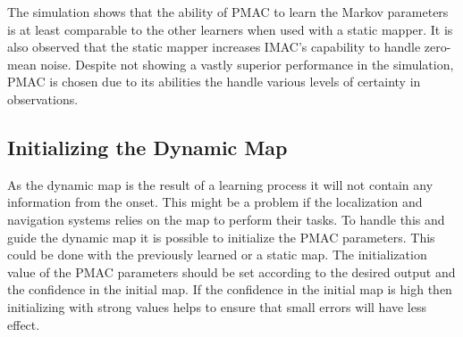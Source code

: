 The simulation shows that the ability of PMAC to learn the Markov parameters is at least comparable to the other learners when used with a static mapper. It is also observed that the static mapper increases IMAC's capability to handle zero-mean noise.
Despite not showing a vastly superior performance in the simulation, PMAC is chosen due to its abilities the handle various levels of certainty in observations. 

\subsection{Initializing the Dynamic Map}
As the dynamic map is the result of a learning process it will not contain any information from the onset. 
This might be a problem if the localization and navigation systems relies on the map to perform their tasks.
To handle this and guide the dynamic map it is possible to initialize the PMAC parameters. 
This could be done with the previously learned or a static map.
The initialization value of the PMAC parameters should be set according to the desired output and the confidence in the initial map.
If the confidence in the initial map is high then initializing with strong values helps to ensure that small errors will have less effect.